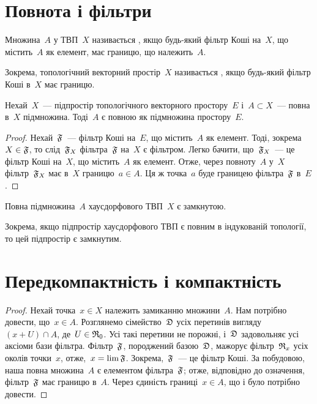 \section{Повнота і фільтри}

\begin{definition}
    Множина~$A$ у ТВП~$X$ називається , якщо будь-який фільтр Коші на~$X$, що містить~$A$ як елемент, має границю, що належить~$A$.
\end{definition}

\begin{remark}
    Зокрема, топологічний векторний простір~$X$ називається , якщо будь-який фільтр Коші в~$X$ має границю.
\end{remark}

\begin{theorem}
    Нехай~$X$~--- підпростір топологічного векторного простору~$E$ і~$A \subset X$~--- повна в~$X$ підмножина. Тоді~$A$ є повною як підмножина простору~$E$.
\end{theorem}

\begin{proof}
    Нехай~$\frak F$~--- фільтр Коші на~$E$, що містить~$A$ як елемент. Тоді, зокрема~$X \in \frak F$, то слід~$\frak F_X$ фільтра~$\frak F$ на~$X$ є фільтром. Легко бачити, що~$\frak F_X$~--- це фільтр Коші на~$X$, що містить~$A$ як елемент. Отже, через повноту~$A$ у~$X$ фільтр~$\frak F_X$ має в~$X$ границю~$a \in A$. Ця ж точка~$a$ буде границею фільтра~$\frak F$ в~$E$.
\end{proof}

\begin{theorem}
    Повна підмножина~$A$ хаусдорфового ТВП~$X$ є замкнутою.
\end{theorem}

\begin{remark}
    Зокрема, якщо підпростір хаусдорфового ТВП є повним в індукованій топології, то цей підпростір є замкнутим.
\end{remark}

\section{Передкомпактність і компактність}

\begin{proof}
    Нехай точка~$x \in X$ належить замиканню множини~$A$. Нам потрібно довести, що~$x \in A$. Розглянемо сімейство~$\frak D$ усіх перетинів вигляду~$(x + U) \cap A$, де~$U \in \frak R_0$. Усі такі перетини не порожні, і~$\frak D$ задовольняє усі аксіоми бази фільтра. Фільтр~$\frak F$, породжений базою~$\frak D$, мажорує фільтр~$\frak R_x$ усіх околів точки~$x$, отже,~$x = \lim \frak F$. Зокрема,~$\frak F$~--- це фільтр Коші. За побудовою, наша повна множина~$A$ є елементом фільтра~$\frak F$; отже, відповідно до означення, фільтр~$\frak F$ має границю в~$A$. Через єдиність границі~$x \in A$, що і було потрібно довести.
\end{proof}

